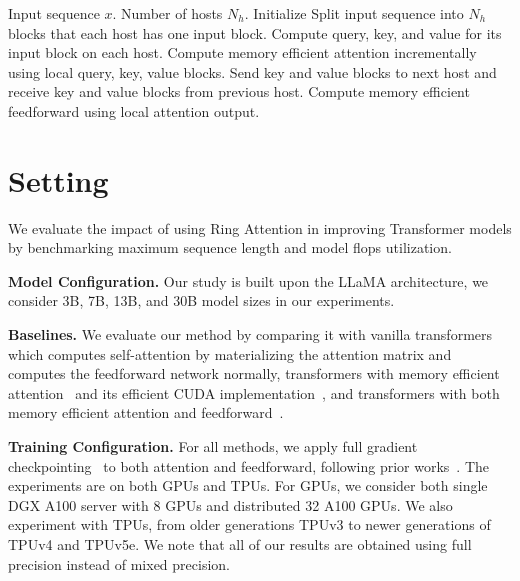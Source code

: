 \begin{algorithm}[!tb]
\caption{Reducing Transformers Memory Cost with {Ring Attention}.}
\label{alg:main}
\begin{algorithmic}
    Input sequence $x$. Number of hosts $N_h$.
   \STATE Initialize \STATE Split input sequence into $N_h$ blocks that each host has one input block.
   \STATE Compute query, key, and value for its input block on each host.
   \STATE Compute memory efficient attention incrementally using local query, key, value blocks.
   \STATE Send key and value blocks to next host and receive key and value blocks from previous host.
   \ENDFOR
   \ENDFOR
   \STATE Compute memory efficient feedforward using local attention output.
   \ENDFOR
   \ENDFOR
\end{algorithmic}
\end{algorithm}

\section{Setting}
We evaluate the impact of using {Ring Attention} in improving Transformer models by benchmarking maximum sequence length and model flops utilization.

\textbf{Model Configuration.} Our study is built upon the LLaMA architecture, we consider 3B, 7B, 13B, and 30B model sizes in our experiments.

\textbf{Baselines.}
We evaluate our method by comparing it with vanilla transformers~\citep{vaswani2017attention} which computes self-attention by materializing the attention matrix and computes the feedforward network normally, transformers with memory efficient attention~\citep{rabe2021self} and its efficient CUDA implementation~\citep{dao2022flashattention}, and transformers with both memory efficient attention and feedforward~\citep{liu2023blockwise}.

\textbf{Training Configuration.} For all methods, we apply full gradient checkpointing~\citep{chen2016training} to both attention and feedforward, following prior works~\citep{rabe2021self, liu2023blockwise}. The experiments are on both GPUs and TPUs. For GPUs, we consider both single DGX A100 server with 8 GPUs and distributed 32 A100 GPUs. We also experiment with TPUs, from older generations TPUv3 to newer generations of TPUv4 and TPUv5e. We note that all of our results are obtained using full precision instead of mixed precision.

